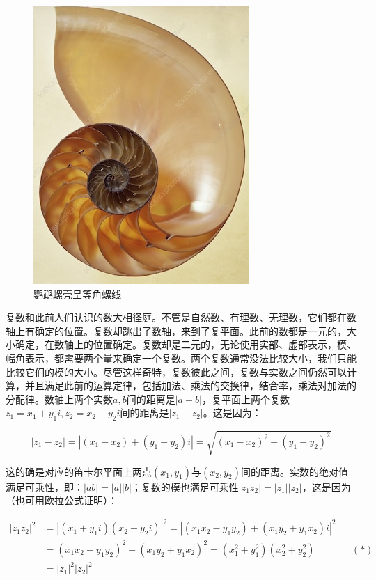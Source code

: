 \documentclass[b5paper]{ctexart}
\begin{document}
\begin{figure}[htbp]
 \centering
 \includegraphics[scale=0.4]{img/nautilus}
 \caption{鹦鹉螺壳呈等角螺线}
 \label{fig:nautilus}
\end{figure}

复数和此前人们认识的数大相径庭。不管是自然数、有理数、无理数，它们都在数轴上有确定的位置。复数却跳出了数轴，来到了复平面。此前的数都是一元的，大小确定，在数轴上的位置确定。复数却是二元的，无论使用实部、虚部表示，模、幅角表示，都需要两个量来确定一个复数。两个复数通常没法比较大小，我们只能比较它们的模的大小。尽管这样奇特，复数彼此之间，复数与实数之间仍然可以计算，并且满足此前的运算定律，包括加法、乘法的交换律，结合率，乘法对加法的分配律。数轴上两个实数$a, b$间的距离是$|a - b|$，复平面上两个复数$z_1 = x_1 + y_1i, z_2 = x_2 + y_2i$间的距离是$|z_1 - z_2|$。这是因为：

\[
|z_1 - z_2| = |(x_1 - x_2) + (y_1 - y_2)i| = \sqrt{(x_1 - x_2)^2 + (y_1 - y_2)^2}
\]

这的确是对应的笛卡尔平面上两点$(x_1, y_1)$与$(x_2, y_2)$间的距离。实数的绝对值满足可乘性，即：$|ab| = |a||b|$；复数的模也满足可乘性$|z_1z_2| = |z_1||z_2|$，这是因为（也可用欧拉公式证明）：

\begin{align*}
|z_1z_2|^2 &= |(x_1 + y_1i)(x_2 + y_2i)|^2 = |(x_1x_2 - y_1y_2) + (x_1y_2 + y_1x_2)i|^2 \\
  &= (x_1x_2 - y_1y_2)^2 + (x_1y_2 + y_1x_2)^2 = (x_1^2 + y_1^2)(x_2^2 + y_2^2) && (*) \\
  &= |z_1|^2|z_2|^2
\end{align*}
\end{document}
